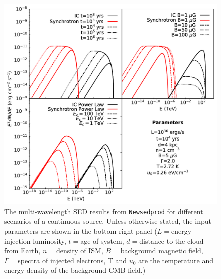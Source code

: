 \newpar
\begin{figure}[hbtp]
    \centering
    \includegraphics[width=\textwidth]{07_Particle_Evolution/Images/Code/leptonic_changing_variabls.pdf}
    \caption{The multi-wavelength SED results from {\tt Newsedprod} for different scenarios of a continuous source. Unless otherwise stated, the input parameters are shown in the bottom-right panel ($L=$energy injection luminosity, $t=$age of system, $d=$distance to the cloud from Earth, $n=$density of ISM, $B=$background magnetic field, $\Gamma=$spectra of injected electrons, T and $u_0$ are the temperature and energy density of the background CMB field.)}
    \label{fig:chapter_7_newsedprod_leptonic_changing}
\end{figure}
